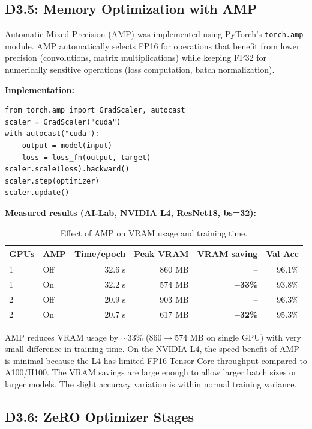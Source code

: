 \documentclass[10pt,twocolumn,letterpaper]{article}
\begin{document}
\subsection{D3.5: Memory Optimization with AMP}

Automatic Mixed Precision (AMP) was implemented using PyTorch's \texttt{torch.amp} module. AMP automatically selects FP16 for operations that benefit from lower precision (convolutions, matrix multiplications) while keeping FP32 for numerically sensitive operations (loss computation, batch normalization).

\textbf{Implementation:}
\begin{verbatim}
from torch.amp import GradScaler, autocast
scaler = GradScaler("cuda")
with autocast("cuda"):
    output = model(input)
    loss = loss_fn(output, target)
scaler.scale(loss).backward()
scaler.step(optimizer)
scaler.update()
\end{verbatim}

\textbf{Measured results (AI-Lab, NVIDIA L4, ResNet18, bs=32):}

\begin{table}[h]
\centering
\caption{Effect of AMP on VRAM usage and training time.}
\label{tab:amp}
\begin{tabular}{@{} l l r r r r @{}}
\toprule
\textbf{GPUs} & \textbf{AMP} & \textbf{Time/epoch} & \textbf{Peak VRAM} & \textbf{VRAM saving} & \textbf{Val Acc} \\
\midrule
1 & Off & 32.6 s & 860 MB & -- & 96.1\% \\
1 & On & 32.2 s & 574 MB & \textbf{--33\%} & 93.8\% \\
2 & Off & 20.9 s & 903 MB & -- & 96.3\% \\
2 & On & 20.7 s & 617 MB & \textbf{--32\%} & 95.3\% \\
\bottomrule
\end{tabular}
\end{table}

AMP reduces VRAM usage by $\sim$33\% (860$\to$574 MB on single GPU) with very small difference in training time. On the NVIDIA L4, the speed benefit of AMP is minimal because the L4 has limited FP16 Tensor Core throughput compared to A100/H100. The VRAM savings are large enough to allow larger batch sizes or larger models. The slight accuracy variation is within normal training variance.

\subsection{D3.6: ZeRO Optimizer Stages}
\end{document}
